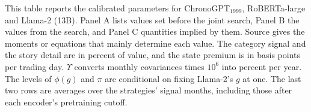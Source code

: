 \documentclass[11pt,letterpaper]{article}
\theoremstyle{remark}
\begin{document}
\begin{table}[htbp]
\centering
\caption{Calibrated Parameters}
\label{tab:D2}
\begin{minipage}{\linewidth}\footnotesize
This table reports the calibrated parameters for ChronoGPT$_{1999}$, RoBERTa-large and Llama-2 (13B). Panel A lists values set before the joint search, Panel B the values from the search, and Panel C quantities implied by them. Source gives the moments or equations that mainly determine each value. The category signal and the story detail are in percent of value, and the state premium is in basis points per trading day. $\Upsilon$ converts monthly covariances times $10^6$ into percent per year. The levels of $\phi(g)$ and $\pi$ are conditional on fixing Llama-2's $g$ at one. The last two rows are averages over the strategies' signal months, including those after each encoder's pretraining cutoff.
\end{minipage}
\medskip


\end{table}
\end{document}
